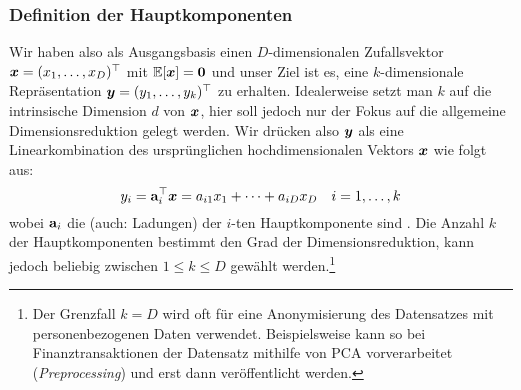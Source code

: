 \subsubsection{Definition der Hauptkomponenten}
\label{ch:MethodenDerDimRed:traditionell:PCA:Definition}
Wir haben also als Ausgangsbasis einen $D$-dimensionalen Zufallsvektor $\bm{x} = (x_1, \ldots, x_D)^\top$ mit $\operatorname{\mathbb{E}}[\bm{x}] = \mathbf{0}$ und unser Ziel ist es, eine $k$-dimensionale Repräsentation $\bm{y} = (y_1,\ldots,y_k)^\top$ zu erhalten. Idealerweise setzt man $k$ auf die intrinsische Dimension $d$ von $\bm{x}$, hier soll jedoch nur der Fokus auf die allgemeine Dimensionsreduktion gelegt werden. Wir drücken also $\bm{y}$ als eine Linearkombination des ursprünglichen hochdimensionalen Vektors $\bm{x}$ wie folgt aus:
\begin{equation}
	y_i = \mathbf{a}_i^\top \bm{x} = a_{i1} x_1 + \cdots + a_{iD} x_D
	\quad i = 1,\ldots,k
\end{equation}
wobei $\mathbf{a}_i$ die  (auch: Ladungen) der $i$-ten Hauptkomponente sind \parencite[vgl.][2]{Jolliffe.2002}. Die Anzahl $k$ der Hauptkomponenten bestimmt den Grad der
Dimensionsreduktion, kann jedoch beliebig zwischen $1 \leq k \leq D$ gewählt werden.\footnote{Der
	Grenzfall $k = D$ wird oft für eine Anonymisierung des Datensatzes mit personenbezogenen Daten
	verwendet. Beispielsweise kann so bei Finanztransaktionen der Datensatz mithilfe von PCA
	vorverarbeitet (\textit{Preprocessing}) und erst dann veröffentlicht werden.}

